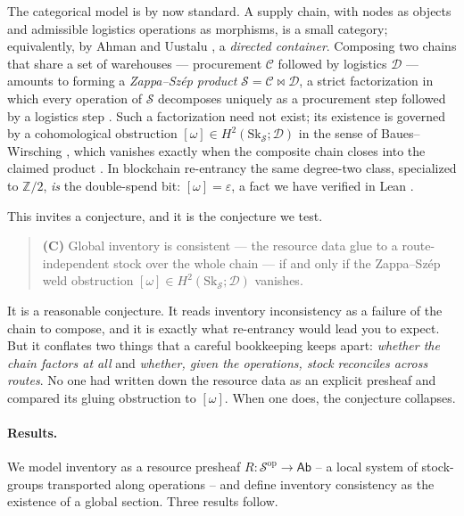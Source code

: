 \documentclass[11pt]{article}
\theoremstyle{definition}
\newcommand{\Ab}{\mathsf{Ab}}
\newcommand{\Sc}{\mathcal{S}}
\newcommand{\C}{\mathcal{C}}
\newcommand{\D}{\mathcal{D}}
\newcommand{\Sk}{\mathrm{Sk}}
\newcommand{\Z}{\mathbb{Z}}
\newcommand{\bowtiemap}{\bowtie}
\begin{document}
The categorical model is by now standard. A supply chain, with nodes as objects and admissible
logistics operations as morphisms, is a small category; equivalently, by Ahman and Uustalu
\cite{au-dccat}, a \emph{directed container}. Composing two chains that share a set of
warehouses --- procurement $\C$ followed by logistics $\D$ --- amounts to forming a
\emph{Zappa--Sz\'ep product} $\Sc=\C\bowtiemap\D$, a strict factorization in which every
operation of $\Sc$ decomposes uniquely as a procurement step followed by a logistics step
\cite{au-distlaw,rw}. Such a factorization need not exist; its existence is governed by a
cohomological obstruction $[\omega]\in H^2(\Sk_\Sc;\D)$ in the sense of
Baues--Wirsching \cite{bw}, which vanishes exactly when the composite chain closes into the
claimed product \cite{gobstr}. In blockchain re-entrancy the same degree-two class, specialized
to $\Z/2$, \emph{is} the double-spend bit: $[\omega]=\varepsilon$, a fact we have verified in
Lean \cite{orch}.

This invites a conjecture, and it is the conjecture we test.

\begin{quote}
\textbf{(C)} Global inventory is consistent --- the resource data glue to a route-independent
stock over the whole chain --- if and only if the Zappa--Sz\'ep weld obstruction
$[\omega]\in H^2(\Sk_\Sc;\D)$ vanishes.
\end{quote}

\noindent It is a reasonable conjecture. It reads inventory inconsistency as a failure of the
chain to compose, and it is exactly what re-entrancy would lead you to expect. But it conflates
two things that a careful bookkeeping keeps apart: \emph{whether the chain factors at all} and
\emph{whether, given the operations, stock reconciles across routes}. No one had written down
the resource data as an explicit presheaf and compared its gluing obstruction to $[\omega]$.
When one does, the conjecture collapses.

\paragraph{Results.} We model inventory as a resource presheaf $R\colon\Sc^{\mathrm{op}}\to\Ab$
-- a local system of stock-groups transported along operations -- and define inventory
consistency as the existence of a global section. Three results follow.
\end{document}

